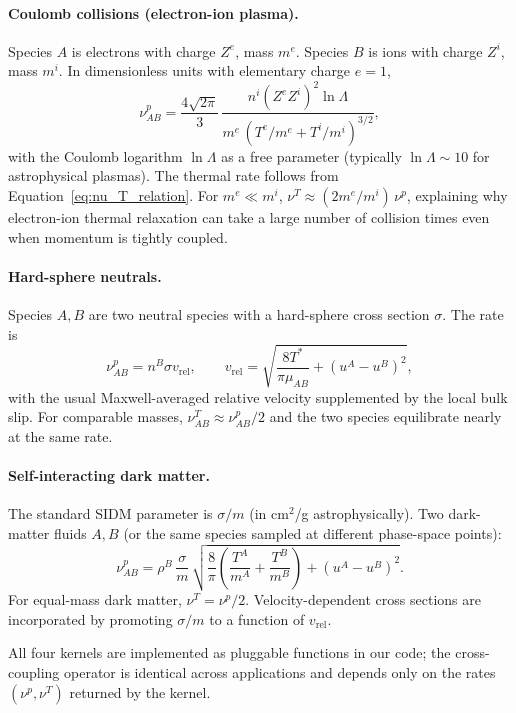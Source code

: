 \documentclass[11pt,letterpaper]{article}
\begin{document}
\paragraph{Coulomb collisions (electron-ion plasma).} Species $A$ is electrons with charge $Z^e$, mass $m^e$. Species $B$ is ions with charge $Z^i$, mass $m^i$. In dimensionless units with elementary charge $e = 1$,
\begin{equation}
\nu^p_{AB} = \frac{4\sqrt{2\pi}}{3}\,\frac{n^i (Z^e Z^i)^2 \ln\Lambda}{m^e\,\left(T^e/m^e + T^i/m^i\right)^{3/2}},
\end{equation}
with the Coulomb logarithm $\ln\Lambda$ as a free parameter (typically $\ln\Lambda \sim 10$ for astrophysical plasmas). The thermal rate follows from Equation~\eqref{eq:nu_T_relation}. For $m^e \ll m^i$, $\nu^T \approx (2 m^e/m^i)\,\nu^p$, explaining why electron-ion thermal relaxation can take a large number of collision times even when momentum is tightly coupled.

\paragraph{Hard-sphere neutrals.} Species $A, B$ are two neutral species with a hard-sphere cross section $\sigma$. The rate is
\begin{equation}
\nu^p_{AB} = n^B \sigma v_{\mathrm{rel}}, \qquad v_{\mathrm{rel}} = \sqrt{\frac{8 T^*}{\pi \mu_{AB}} + (u^A - u^B)^2},
\end{equation}
with the usual Maxwell-averaged relative velocity supplemented by the local bulk slip. For comparable masses, $\nu^T_{AB} \approx \nu^p_{AB}/2$ and the two species equilibrate nearly at the same rate.

\paragraph{Self-interacting dark matter.} The standard SIDM parameter is $\sigma/m$ (in cm$^2$/g astrophysically). Two dark-matter fluids $A, B$ (or the same species sampled at different phase-space points):
\begin{equation}
\nu^p_{AB} = \rho^B\,\frac{\sigma}{m}\,\sqrt{\frac{8}{\pi}\left(\frac{T^A}{m^A} + \frac{T^B}{m^B}\right) + (u^A - u^B)^2}.
\end{equation}
For equal-mass dark matter, $\nu^T = \nu^p/2$. Velocity-dependent cross sections are incorporated by promoting $\sigma/m$ to a function of $v_{\mathrm{rel}}$.

All four kernels are implemented as pluggable functions in our code; the cross-coupling operator is identical across applications and depends only on the rates $(\nu^p, \nu^T)$ returned by the kernel.
\end{document}
